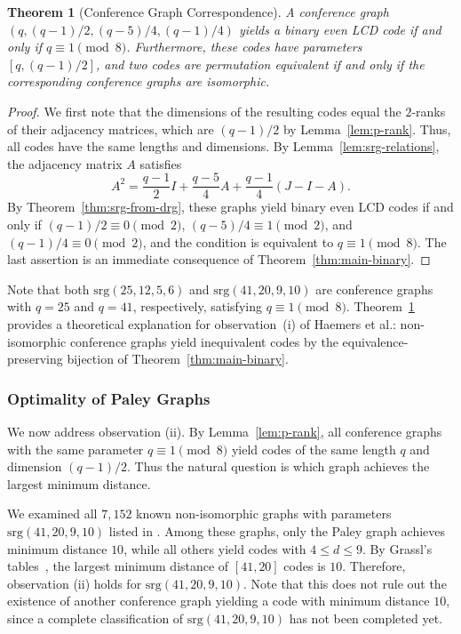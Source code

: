 \documentclass[a4paper,11pt]{article}
\newtheorem{theorem}{Theorem}[section]
\theoremstyle{remark}
\begin{document}
\begin{theorem}[Conference Graph Correspondence]\label{thm:conference}
A conference graph $(q,(q-1)/2,(q-5)/4,(q-1)/4)$ yields a binary even LCD code if and only if $q \equiv 1 \pmod 8$.
Furthermore, these codes have parameters $[q, (q-1)/2]$, and two codes are permutation equivalent if and only if the corresponding conference graphs are isomorphic.
\end{theorem}

\begin{proof}
We first note that the dimensions of the resulting codes equal the $2$-ranks of their adjacency matrices, which are $(q-1)/2$ by Lemma~\ref{lem:p-rank}.
Thus, all codes have the same lengths and dimensions.
By Lemma~\ref{lem:srg-relations}, the adjacency matrix $A$ satisfies
\[
A^2 = \frac{q-1}{2}I + \frac{q-5}{4}A + \frac{q-1}{4}(J-I-A).
\]
By Theorem~\ref{thm:srg-from-drg}, these graphs yield binary even LCD codes if and only if $(q-1)/2 \equiv 0 \pmod 2$, $(q-5)/4 \equiv 1 \pmod 2$, and $(q-1)/4 \equiv 0 \pmod 2$, and the condition is equivalent to $q \equiv 1 \pmod 8$.
The last assertion is an immediate consequence of Theorem~\ref{thm:main-binary}.
\end{proof}

Note that both $\text{srg}(25,12,5,6)$ and $\text{srg}(41,20,9,10)$ are conference graphs with $q = 25$ and $q = 41$, respectively, satisfying $q \equiv 1 \pmod 8$.
Theorem~\ref{thm:conference} provides a theoretical explanation for observation~(i) of Haemers et al.: non-isomorphic conference graphs yield inequivalent codes by the equivalence-preserving bijection of Theorem~\ref{thm:main-binary}.

\subsubsection{Optimality of Paley Graphs}
We now address observation (ii).
By Lemma~\ref{lem:p-rank}, all conference graphs with the same parameter $q \equiv 1 \pmod 8$ yield codes of the same length $q$ and dimension $(q-1)/2$. Thus the natural question is which graph achieves the largest minimum distance.

We examined all $7{,}152$ known non-isomorphic graphs with parameters $\text{srg}(41,20,9,10)$ listed in \cite{maksimovic2022}.
Among these graphs, only the Paley graph achieves minimum distance $10$, while all others yield codes with $4 \leq d \leq 9$.
By Grassl's tables~\cite{grassl}, the largest minimum distance of $[41,20]$ codes is $10$.
Therefore, observation (ii) holds for $\text{srg}(41,20,9,10)$.
Note that this does not rule out the existence of another conference graph yielding a code with minimum distance $10$, since a complete classification of $\text{srg}(41,20,9,10)$ has not been completed yet.
\end{document}
